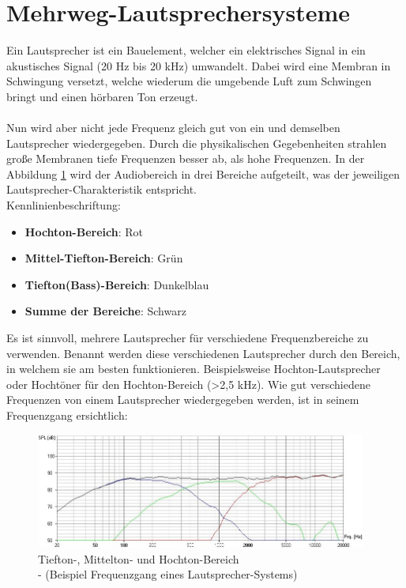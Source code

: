 \section{Mehrweg-Lautsprechersysteme}\label{sec:3.2}
Ein Lautsprecher ist ein Bauelement, welcher ein elektrisches Signal in ein akustisches Signal (20 Hz bis 20 kHz) umwandelt.
Dabei wird eine Membran in Schwingung versetzt, welche wiederum die umgebende Luft zum Schwingen bringt und einen hörbaren Ton erzeugt.
\\ \\
Nun wird aber nicht jede Frequenz gleich gut von ein und demselben Lautsprecher wiedergegeben.
Durch die physikalischen Gegebenheiten strahlen große Membranen tiefe Frequenzen besser ab, als hohe Frequenzen.
In der Abbildung \ref{fig:3.2.1} wird der Audiobereich in drei Bereiche aufgeteilt, was der jeweiligen Lautsprecher-Charakteristik entspricht.\\
Kennlinienbeschriftung:\\
\begin{itemize}
	\item \textbf{Hochton-Bereich}: Rot
	\item \textbf{Mittel-Tiefton-Bereich}: Grün
	\item \textbf{Tiefton(Bass)-Bereich}: Dunkelblau
	\item \textbf{Summe der Bereiche}: Schwarz	
\end{itemize}
Es ist sinnvoll, mehrere Lautsprecher für verschiedene Frequenzbereiche zu verwenden.
Benannt werden diese verschiedenen Lautsprecher durch den Bereich, in welchem sie am besten funktionieren.
Beispielsweise Hochton-Lautsprecher oder Hochtöner für den Hochton-Bereich (>2,5 kHz).
Wie gut verschiedene Frequenzen von einem Lautsprecher wiedergegeben werden, ist in seinem Frequenzgang ersichtlich:
\begin{figure} [H]
	\centering
	\includegraphics[width=0.97\textwidth]{img/Grundlagen/Mehrweg-Lautsprechersysteme/Frequenzbereiche-Audio-cut.jpg}
	\caption[Tiefton-, Mittelton- und Hochton-Bereich\\- (Beispiel Frequenzgang eines Lautsprecher-Systems)]{Tiefton-, Mittelton- und Hochton-Bereich\\- (Beispiel Frequenzgang eines Lautsprecher-Systems)\footnotemark}
	\label{fig:3.2.1}
\end{figure}


